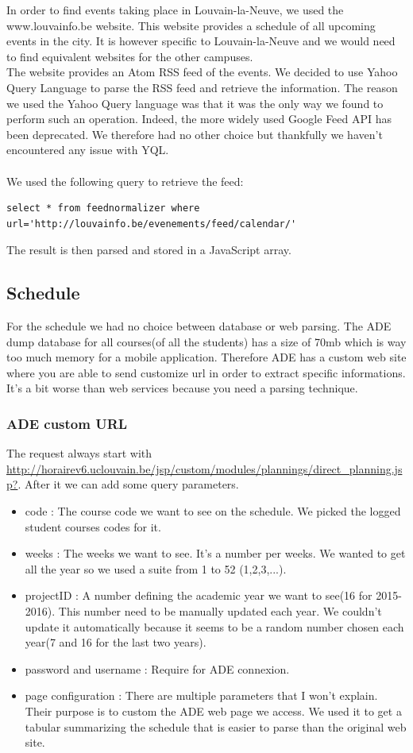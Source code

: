 \documentclass[11pt, a4paper]{report}
\begin{document}
In order to find events taking place in Louvain-la-Neuve, we used the www.louvainfo.be website. This website provides a schedule of all upcoming events in the city. It is however specific to Louvain-la-Neuve and we would need to find equivalent websites for the other campuses. \\ The website provides an Atom RSS feed of the events. We decided to use Yahoo Query Language to parse the RSS feed and retrieve the information. The reason we used the Yahoo Query language was that it was the only way we found to perform such an operation. Indeed, the more widely used Google Feed API has been deprecated. We therefore had no other choice but thankfully we haven't encountered any issue with YQL.\\
\\We used the following query to retrieve the feed:
\begin{verbatim}
select * from feednormalizer where url='http://louvainfo.be/evenements/feed/calendar/'
\end{verbatim}
The result is then parsed and stored in a JavaScript array. 


\subsection{Schedule}
For the schedule we had no choice between database or web parsing. The ADE dump database for all courses(of all the students) has a size of 70mb which is way too much memory for a mobile application. Therefore ADE has a custom web site where you are able to send customize url in order to extract specific informations. It's a bit worse than web services because you need a parsing technique.
\subsubsection{ADE custom URL}
The request always start with \url{http://horairev6.uclouvain.be/jsp/custom/modules/plannings/direct_planning.jsp?}. After it we can add some query parameters.
\begin{itemize}
\item code : The course code we want to see on the schedule. We picked the logged student courses codes for it.
\item weeks : The weeks we want to see. It's a number per weeks. We wanted to get all the year so we used a suite from 1 to 52 (1,2,3,...).
\item projectID : A number defining the academic year we want to see(16 for 2015-2016). This number need to be manually updated each year. We couldn't update it automatically because it seems to be a random number chosen each year(7 and 16 for the last two years).
\item password and username : Require for ADE connexion.
\item page configuration : There are multiple parameters that I won't explain. Their purpose is to custom the ADE web page we access. We used it to get a tabular summarizing the schedule that is easier to parse than the original web site. 
\end{itemize}
\end{document}
